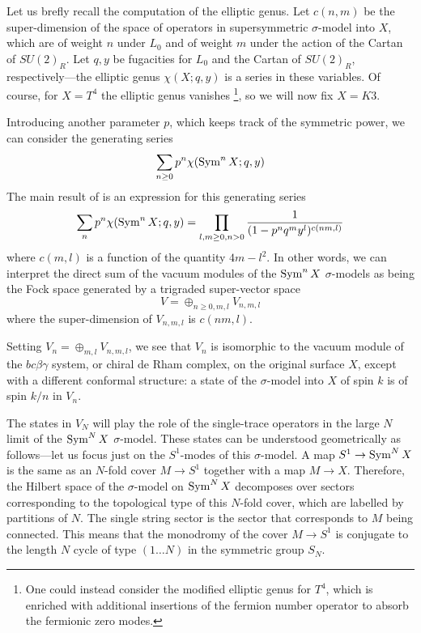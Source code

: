 \documentclass[../main.tex]{subfiles}
\begin{document}
Let us brefly recall the computation of the elliptic genus. Let $c(n,m)$ be the super-dimension of the space of operators in supersymmetric $\sigma$-model into $X$, which are of weight $n$ under $L_0$ and of weight $m$ under the action of the Cartan of $SU(2)_R$.  
Let $q,y$ be fugacities for $L_0$ and the Cartan of $SU(2)_R$, respectively---the elliptic genus $\chi(X;q,y)$ is a series in these variables.  
Of course, for $X = T^4$ the elliptic genus vanishes \footnote{One could instead consider the modified elliptic genus for $T^4$, which is enriched with additional insertions of the fermion number operator to absorb the fermionic zero modes.}, so we will now fix $X = K3$.

Introducing another parameter $p$, which keeps track of the symmetric power, we can consider the generating series
\begin{equation} 
	\sum_{n \geq 0} p^n \chi(\operatorname{Sym}^n X; q,y) 
\end{equation}
The main result of \cite{deBoerEG, DMVV} is an expression for this generating series
\begin{equation} 
	\sum_{n} p^n \chi(\operatorname{Sym}^n X; q,y) = \prod_{l,m \geq 0,n >0 } \frac{1}{(1 - p^n q^m y^l)^{c(nm,l)}}
\end{equation}
where $c(m,l)$ is a function of the quantity $4m-l^2$.
In other words, we can interpret the direct sum of the vacuum modules of the $\operatorname{Sym}^n X$ $\sigma$-models as being the Fock space generated by a trigraded super-vector space 
\begin{equation} 
	V =\oplus_{n \ge 0,m,l} V_{n,m,l} 
\end{equation}
where the super-dimension of $V_{n,m,l}$ is $c(nm,l)$.

Setting $V_n = \oplus_{m,l} V_{n,m,l}$, we see that $V_n$ is isomorphic to the vacuum module of the $bc\beta\gamma$ system, or chiral de Rham complex, on the original surface $X$, except with a different conformal structure: a state of the $\sigma$-model into $X$ of spin $k$ is of spin $k/n$ in $V_n$.  

The states in $V_N$ will play the role of the single-trace operators in the large $N$ limit of the $\operatorname{Sym}^N X$ $\sigma$-model.   
These states can be understood geometrically as follows---let us focus just on the $S^1$-modes of this $\sigma$-model.
A map $S^1 \to \operatorname{Sym}^N X$ is the same as an $N$-fold cover $M \to S^1$ together with a map $M \to X$.  
Therefore, the Hilbert space of the $\sigma$-model on $\operatorname{Sym}^N X$ decomposes over sectors corresponding to the topological type of this $N$-fold cover, which are labelled by partitions of $N$. 
The single string sector is the sector that corresponds to $M$ being connected. 
This means that the monodromy of the cover $M \to  S^1$ is conjugate to the length $N$ cycle of type $(1 \dots N)$ in the symmetric group $S_N$.  
\end{document}
